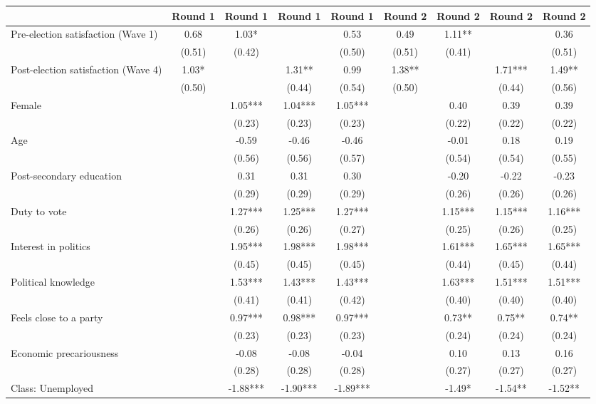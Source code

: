 \begin{table}
\centering
\begin{tabular}[t]{lcccccccc}
\toprule
  & Round 1 & Round 1  & Round 1   & Round 1    & Round 2 & Round 2  & Round 2   & Round 2   \\
\midrule
Pre-election satisfaction (Wave 1) & 0.68 & 1.03* &  & 0.53 & 0.49 & 1.11** &  & 0.36\\
 & (0.51) & (0.42) &  & (0.50) & (0.51) & (0.41) &  & (0.51)\\
Post-election satisfaction (Wave 4) & 1.03* &  & 1.31** & 0.99 & 1.38** &  & 1.71*** & 1.49**\\
 & (0.50) &  & (0.44) & (0.54) & (0.50) &  & (0.44) & (0.56)\\
Female &  & 1.05*** & 1.04*** & 1.05*** &  & 0.40 & 0.39 & 0.39\\
 &  & (0.23) & (0.23) & (0.23) &  & (0.22) & (0.22) & (0.22)\\
Age &  & -0.59 & -0.46 & -0.46 &  & -0.01 & 0.18 & 0.19\\
 &  & (0.56) & (0.56) & (0.57) &  & (0.54) & (0.54) & (0.55)\\
Post-secondary education &  & 0.31 & 0.31 & 0.30 &  & -0.20 & -0.22 & -0.23\\
 &  & (0.29) & (0.29) & (0.29) &  & (0.26) & (0.26) & (0.26)\\
Duty to vote &  & 1.27*** & 1.25*** & 1.27*** &  & 1.15*** & 1.15*** & 1.16***\\
 &  & (0.26) & (0.26) & (0.27) &  & (0.25) & (0.26) & (0.25)\\
Interest in politics &  & 1.95*** & 1.98*** & 1.98*** &  & 1.61*** & 1.65*** & 1.65***\\
 &  & (0.45) & (0.45) & (0.45) &  & (0.44) & (0.45) & (0.44)\\
Political knowledge &  & 1.53*** & 1.43*** & 1.43*** &  & 1.63*** & 1.51*** & 1.51***\\
 &  & (0.41) & (0.41) & (0.42) &  & (0.40) & (0.40) & (0.40)\\
Feels close to a party &  & 0.97*** & 0.98*** & 0.97*** &  & 0.73** & 0.75** & 0.74**\\
 &  & (0.23) & (0.23) & (0.23) &  & (0.24) & (0.24) & (0.24)\\
Economic  precariousness &  & -0.08 & -0.08 & -0.04 &  & 0.10 & 0.13 & 0.16\\
 &  & (0.28) & (0.28) & (0.28) &  & (0.27) & (0.27) & (0.27)\\
Class: Unemployed &  & -1.88*** & -1.90*** & -1.89*** &  & -1.49* & -1.54** & -1.52**\\

\end{tabular}
\end{table}
